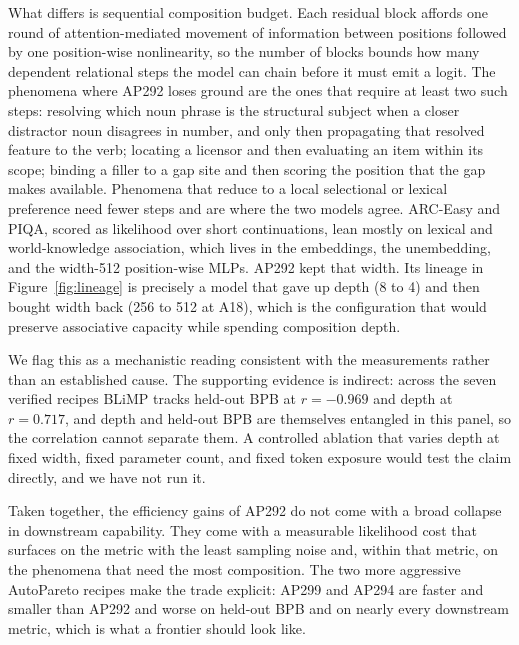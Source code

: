 \documentclass{article}
\begin{document}
What differs is sequential composition budget. Each residual block affords one round of attention-mediated movement of information between positions followed by one position-wise nonlinearity, so the number of blocks bounds how many dependent relational steps the model can chain before it must emit a logit. The phenomena where AP292 loses ground are the ones that require at least two such steps: resolving which noun phrase is the structural subject when a closer distractor noun disagrees in number, and only then propagating that resolved feature to the verb; locating a licensor and then evaluating an item within its scope; binding a filler to a gap site and then scoring the position that the gap makes available. Phenomena that reduce to a local selectional or lexical preference need fewer steps and are where the two models agree. ARC-Easy and PIQA, scored as likelihood over short continuations, lean mostly on lexical and world-knowledge association, which lives in the embeddings, the unembedding, and the width-512 position-wise MLPs. AP292 kept that width. Its lineage in Figure~\ref{fig:lineage} is precisely a model that gave up depth (8 to 4) and then bought width back (256 to 512 at A18), which is the configuration that would preserve associative capacity while spending composition depth.

We flag this as a mechanistic reading consistent with the measurements rather than an established cause. The supporting evidence is indirect: across the seven verified recipes BLiMP tracks held-out BPB at $r=-0.969$ and depth at $r=0.717$, and depth and held-out BPB are themselves entangled in this panel, so the correlation cannot separate them. A controlled ablation that varies depth at fixed width, fixed parameter count, and fixed token exposure would test the claim directly, and we have not run it.

Taken together, the efficiency gains of AP292 do not come with a broad collapse in downstream capability. They come with a measurable likelihood cost that surfaces on the metric with the least sampling noise and, within that metric, on the phenomena that need the most composition. The two more aggressive AutoPareto recipes make the trade explicit: AP299 and AP294 are faster and smaller than AP292 and worse on held-out BPB and on nearly every downstream metric, which is what a frontier should look like.
\end{document}
